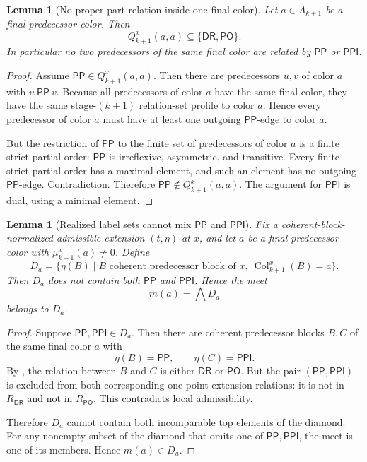 \documentclass[11pt]{article}
\newtheorem{lemma}[theorem]{Lemma}
\theoremstyle{definition}
\newcommand{\DR}{\mathsf{DR}}
\newcommand{\PO}{\mathsf{PO}}
\newcommand{\PP}{\mathsf{PP}}
\newcommand{\PPI}{\mathsf{PPI}}
\newcommand{\Col}{\operatorname{Col}}
\newcommand{\bigmeet}{\mathop{\bigwedge}}
\begin{document}
\begin{lemma}[No proper-part relation inside one final color]\label{lem:noPPsamecolor}
Let $a\in A_{k+1}$ be a final predecessor color. Then
\[
Q^x_{k+1}(a,a)\subseteq \{\DR,\PO\}.
\]
In particular no two predecessors of the same final color are related by $\PP$ or $\PPI$.
\end{lemma}

\begin{proof}
Assume $\PP\in Q^x_{k+1}(a,a)$. Then there are predecessors $u,v$ of color $a$ with $u\ \PP\ v$. Because all predecessors of color $a$ have the same final color, they have the same stage-$(k+1)$ relation-set profile to color $a$. Hence every predecessor of color $a$ must have at least one outgoing $\PP$-edge to color $a$.

But the restriction of $\PP$ to the finite set of predecessors of color $a$ is a finite strict partial order: $\PP$ is irreflexive, asymmetric, and transitive. Every finite strict partial order has a maximal element, and such an element has no outgoing $\PP$-edge. Contradiction. Therefore $\PP\notin Q^x_{k+1}(a,a)$. The argument for $\PPI$ is dual, using a minimal element.
\end{proof}

\begin{lemma}[Realized label sets cannot mix $\PP$ and $\PPI$]\label{lem:noppppi}
Fix a coherent-block-normalized admissible extension $(t,\eta)$ at $x$, and let $a$ be a final predecessor color with $\mu^x_{k+1}(a)\neq 0$. Define
\[
D_a=\{\eta(B)\mid B\text{ coherent predecessor block of }x,\ \Col^x_{k+1}(B)=a\}.
\]
Then $D_a$ does not contain both $\PP$ and $\PPI$. Hence the meet
\[
m(a)=\bigmeet D_a
\]
belongs to $D_a$.
\end{lemma}

\begin{proof}
Suppose $\PP,\PPI\in D_a$. Then there are coherent predecessor blocks $B,C$ of the same final color $a$ with
\[
\eta(B)=\PP,
\qquad
\eta(C)=\PPI.
\]
By , the relation between $B$ and $C$ is either $\DR$ or $\PO$. But the pair $(\PP,\PPI)$ is excluded from both corresponding one-point extension relations: it is not in $R_{\DR}$ and not in $R_{\PO}$. This contradicts local admissibility.

Therefore $D_a$ cannot contain both incomparable top elements of the diamond. For any nonempty subset of the diamond that omits one of $\PP,\PPI$, the meet is one of its members. Hence $m(a)\in D_a$.
\end{proof}
\end{document}

